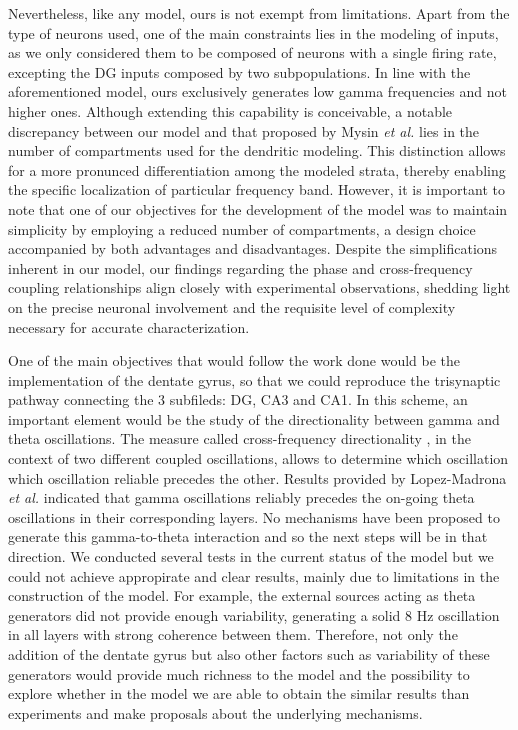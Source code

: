 \documentclass[../main.tex]{subfiles}
\begin{document}
Nevertheless, like any model, ours is not exempt from limitations.
Apart from the type of neurons used, one of the main constraints lies in the modeling of inputs, as we only considered them to be composed of neurons with a single firing rate, excepting the DG inputs composed by two subpopulations. 
In line with the aforementioned model, ours exclusively generates low gamma frequencies and not higher ones.
Although extending this capability is conceivable, a notable discrepancy between our model and that proposed by Mysin \textit{et al.} \citep{mysin_model_2021} lies in the number of compartments used for the dendritic modeling.
This distinction allows for a more pronunced differentiation among the modeled strata, thereby enabling the specific localization of particular frequency band.
However, it is important to note that one of our objectives for the development of the model was to maintain simplicity by employing a reduced number of compartments, a design choice accompanied by both advantages and disadvantages.
Despite the simplifications inherent in our model, our findings regarding the phase and cross-frequency coupling relationships align closely with experimental observations, shedding light on the precise neuronal involvement and the requisite level of complexity necessary for accurate characterization.

One of the main objectives that would follow the work done would be the implementation of the dentate gyrus, so that we could reproduce the trisynaptic pathway connecting the 3 subfileds: DG, CA3 and CA1.
In this scheme, an important element would be the study of the directionality between gamma and theta oscillations.
The measure called cross-frequency directionality \citep{jiang_measuring_2015}, in the context of two different coupled oscillations, allows to determine which oscillation which oscillation reliable precedes the other.
Results provided by Lopez-Madrona \textit{et al.} \citep{lopez-madrona_different_2020} indicated that gamma oscillations reliably precedes the on-going theta oscillations in their corresponding layers.
No mechanisms have been proposed to generate this gamma-to-theta interaction and so the next steps will be in that direction.
We conducted several tests in the current status of the model but we could not achieve appropirate and clear results,
mainly due to limitations in the construction of the model.
For example, the external sources acting as theta generators did not provide enough variability, generating a solid 8 Hz oscillation in all layers with strong coherence between them.
Therefore, not only the addition of the dentate gyrus but also other factors such as variability of these generators would provide much richness to the model and the possibility to explore whether in the model we are able to obtain the similar results than experiments and make proposals about the underlying mechanisms.
\end{document}
